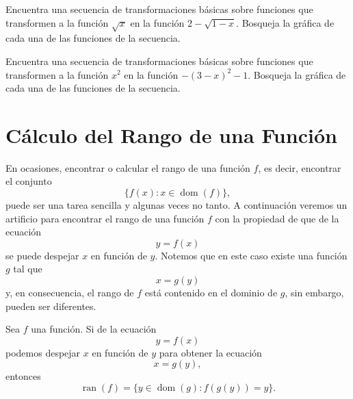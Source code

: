 \documentclass[12pt,a4paper]{book}
\DeclareMathOperator{\dom}{dom}
\DeclareMathOperator{\ran}{ran}
\begin{document}
    \begin{ejercicio}\label{ej:111}
        Encuentra una secuencia de transformaciones básicas sobre
        funciones que transformen a la función $\sqrt{x}$ en la función $2-\sqrt{1-x}$. Bosqueja
        la gráfica de cada una de las funciones de la secuencia.
    \end{ejercicio}

    \begin{ejercicio}\label{ej:112}
        Encuentra una secuencia de transformaciones básicas sobre
        funciones que transformen a la función $x^{2}$ en la función $-(3-x)^{2}-1$.
        Bosqueja la gráfica de cada una de las funciones de la secuencia.
    \end{ejercicio}

    \section{Cálculo del Rango de una Función}

    En ocasiones, encontrar o calcular el rango de una función $f$, es decir,
    encontrar el conjunto
    \begin{equation*}
        \{f(x):x\in\dom(f)\},
    \end{equation*}
    puede ser una tarea sencilla y algunas veces no tanto. A continuación veremos
    un artificio para encontrar el rango de una función $f$ con la propiedad de que
    de la ecuación
    \begin{equation*}
        y=f(x)
    \end{equation*}
    se puede despejar $x$ en función de $y$. Notemos que en este caso existe una
    función $g$ tal que
    \begin{equation*}
        x=g(y)
    \end{equation*}
    y, en consecuencia, el rango de $f$ está contenido en el dominio de $g$, sin
    embargo, pueden ser diferentes.

    \begin{proposicion}\label{prop:23}
        Sea $f$ una función. Si de la ecuación
        \begin{equation}\label{eq:rango-1}
            y=f(x)
        \end{equation}
        podemos despejar $x$ en función de $y$ para obtener la ecuación
        \begin{equation}\label{eq:rango-2}
            x=g(y),
        \end{equation}
        entonces
        \begin{equation}\label{eq:rango-3}
            \ran(f)=\{y\in\dom(g):f(g(y))=y\}.
        \end{equation}
    \end{proposicion}
\end{document}
